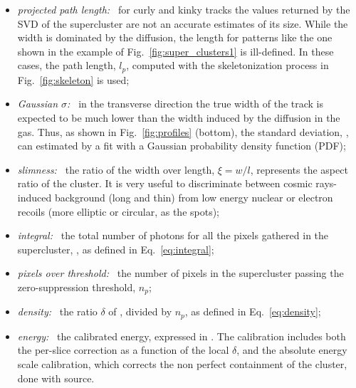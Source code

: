 \begin{itemize}
  \item \textit{projected path length:~} for curly and kinky tracks
    the values returned by the SVD of the supercluster are not an
    accurate estimates of its size. While the width is dominated by
    the diffusion, the length for patterns like the one shown in the
    example of Fig.~\ref{fig:super_clusters1} is ill-defined. In these
    cases, the path length, $l_p$, computed with the skeletonization
    process in Fig.~\ref{fig:skeleton} is used;

  \item \textit{Gaussian $\sigma$:~} in the transverse direction the
    true width of the track is expected to be much lower than the
    width induced by the diffusion in the gas. Thus, as shown in
    Fig.~\ref{fig:profiles} (bottom), the standard deviation,
    \tsigmag, can estimated by a fit with a Gaussian probability
    density function (PDF);

  \item \textit{slimness:~} the ratio of the width over length,
    $\xi=w/l$, represents the aspect ratio of the cluster. It is very
    useful to discriminate between cosmic rays-induced background
    (long and thin) from low energy nuclear or electron recoils (more
    elliptic or circular, as the \fe spots);
    
  \item \textit{integral:~} the total number of photons for all the
  pixels gathered in the supercluster, \isclu, as defined in
  Eq.~\ref{eq:integral};

  \item \textit{pixels over threshold:~} the number of pixels in the
  supercluster passing the zero-suppression threshold, $n_p$;

  \item \textit{density:~} the ratio $\delta$ of \isclu, divided by
  $n_p$, as defined in Eq.~\ref{eq:density};

  \item \textit{energy:~} the calibrated energy, expressed in
    \keV. The calibration includes both the per-slice correction as a
    function of the local $\delta$, and the absolute energy scale
    calibration, which corrects the non perfect containment of the
    cluster, done with \fe source.
\end{itemize}

